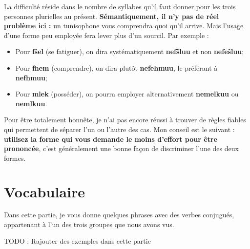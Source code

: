 La difficulté réside dans le nombre de syllabes qu'il faut donner pour les trois personnes plurielles au présent. \textbf{Sémantiquement, il n'y pas de réel problème ici :} un tunisophone vous comprendra quoi qu'il arrive. Mais l'usage d'une forme peu employée fera lever plus d'un sourcil. Par exemple :
 \begin{itemize}
     \item Pour \textbf{f\v{s}el} (se fatiguer), on dira systématiquement \textbf{nef\v{s}luu} et non \textbf{nefe\v{s}luu};
     \item Pour \textbf{fhem} (comprendre), on dira plutôt \textbf{nefehmuu}, le préférant à \textbf{nefhmuu};
     \item Pour \textbf{mlek} (posséder), on pourra employer alternativement \textbf{nemelkuu} ou \textbf{nemlkuu}.
 \end{itemize}

Pour être totalement honnête, je n'ai pas encore réussi à trouver de règles fiables qui permettent de séparer l'un ou l'autre des cas. Mon conseil est le suivant : \textbf{utilisez la forme qui vous demande le moins d'effort pour être prononcée}, c'est généralement une bonne façon de discriminer l'une des deux formes.

\section*{Vocabulaire}
Dans cette partie, je vous donne quelques phrases avec des verbes conjugués, appartenant à l'un des trois groupes que nous avons vus. 

TODO : Rajouter des exemples dans cette partie 
